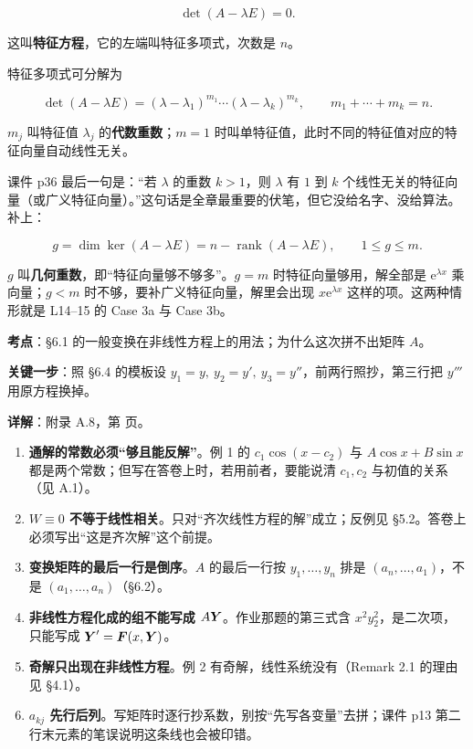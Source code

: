 \documentclass[11pt]{ctexart}
\renewcommand{\qbreak}{\needspace{0.26\textheight}}
\newcommand{\rank}{\operatorname{rank}}
\begin{document}
\[
\det(A-\lambda E)=0 .
\]

这叫\textbf{特征方程}，它的左端叫特征多项式，次数是 $n$。


特征多项式可分解为

\[
\det(A-\lambda E)=(\lambda-\lambda_1)^{m_1}\cdots(\lambda-\lambda_k)^{m_k},
\qquad m_1+\cdots+m_k=n .
\]

$m_j$ 叫特征值 $\lambda_j$ 的\textbf{代数重数}；$m=1$ 时叫单特征值，此时不同的特征值对应的特征向量自动线性无关。

课件 p36 最后一句是：“若 $\lambda$ 的重数 $k>1$，则 $\lambda$ 有 $1$ 到 $k$ 个线性无关的特征向量（或广义特征向量）。”这句话是全章最重要的伏笔，但它没给名字、没给算法。补上：

\[
g=\dim\ker(A-\lambda E)=n-\rank(A-\lambda E),\qquad 1\le g\le m .
\]

$g$ 叫\textbf{几何重数}，即“特征向量够不够多”。$g=m$ 时特征向量够用，解全部是 $\mathrm{e}^{\lambda x}$ 乘向量；$g<m$ 时不够，要补广义特征向量，解里会出现 $x\mathrm{e}^{\lambda x}$ 这样的项。这两种情形就是 L14--15 的 Case 3a 与 Case 3b。


\qbreak
{}
\par\textbf{考点}：§6.1 的一般变换在非线性方程上的用法；为什么这次拼不出矩阵 $A$。
\par\textbf{关键一步}：照 §6.4 的模板设 $y_1=y,\ y_2=y',\ y_3=y''$，前两行照抄，第三行把 $y'''$ 用原方程换掉。
\par\textbf{详解}：附录 A.8，第 \pageref{c1:app:a8} 页。


\begin{enumerate}
  \item \textbf{通解的常数必须“够且能反解”}。例 1 的 $c_1\cos(x-c_2)$ 与 $A\cos x+B\sin x$ 都是两个常数；但写在答卷上时，若用前者，要能说清 $c_1,c_2$ 与初值的关系（见 A.1）。
  \item \textbf{$W\equiv0$ 不等于线性相关}。只对“齐次线性方程的解”成立；反例见 §5.2。答卷上必须写出“这是齐次解”这个前提。
  \item \textbf{变换矩阵的最后一行是倒序}。$A$ 的最后一行按 $y_1,\dots,y_n$ 排是 $(a_n,\dots,a_1)$，不是 $(a_1,\dots,a_n)$（§6.2）。
  \item \textbf{非线性方程化成的组不能写成 $A\boldsymbol{Y}$}。作业那题的第三式含 $x^2y_2^2$，是二次项，只能写成 $\boldsymbol{Y}'=\boldsymbol{F}(x,\boldsymbol{Y})$。
  \item \textbf{奇解只出现在非线性方程}。例 2 有奇解，线性系统没有（Remark 2.1 的理由见 §4.1）。
  \item \textbf{$a_{kj}$ 先行后列}。写矩阵时逐行抄系数，别按“先写各变量”去拼；课件 p13 第二行末元素的笔误说明这条线也会被印错。
\end{enumerate}
\end{document}
